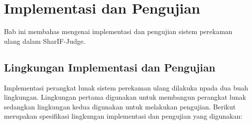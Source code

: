 \chapter{Implementasi dan Pengujian}
\label{chap:implementasidanpengujian}

Bab ini membahas mengenai implementasi dan pengujian sistem perekaman ulang dalam SharIF-Judge.

\section{Lingkungan Implementasi dan Pengujian}
\label{sec:5:lingkungan}

Implementasi perangkat lunak sistem perekaman ulang dilakuka npada dua buah lingkungan. Lingkungan pertama digunakan untuk membangun perangkat lunak sedangkan lingkungan kedua digunakan untuk melakukan pengujian. Berikut merupakan spesifikasi lingkungan implementasi dan pengujian yang digunakan:

